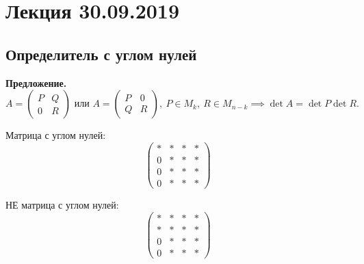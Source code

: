 \section{Лекция 30.09.2019}

\subsection{Определитель с углом нулей}

\textbf{Предложение.}
\begin{equation*}
    A = \left(
        \begin{array}{c|c}
            P & Q \\
            \hline
            0 & R
        \end{array}
    \right) \text{ или } A =
    \left(
        \begin{array}{c|c}
            P & 0 \\
            \hline
            Q & R
        \end{array}
    \right), \ P \in M_k, \ R \in M_{n-k} \implies \det A = \det P \det R
.\end{equation*}

Матрица с углом нулей:
\begin{equation*}
\left(
\begin{array}{c|ccc}
  * & * & * & * \\
  \hline
  0 & * & * & * \\
  0 & * & * & * \\
  0 & * & * & *
\end{array}
\right)
\end{equation*}

НЕ матрица с углом нулей:
\begin{equation*}
\left(
\begin{array}{c|ccc}
  * & * & * & * \\
  * & * & * & * \\
  \hline
  0 & * & * & * \\
  0 & * & * & *
\end{array}
\right)
\end{equation*}

